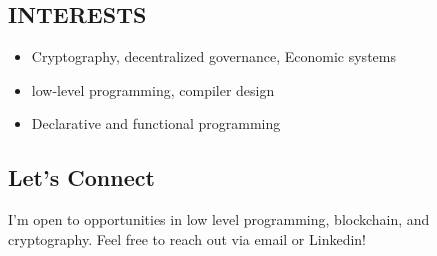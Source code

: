 \documentclass[10pt,letterpaper]{article}
\begin{document}
\begin{minipage}[t]{0.47\textwidth}
\subsection*{INTERESTS}
\label{sec:org844b368}
\begin{itemize}
\item Cryptography, decentralized governance, Economic systems
\item low-level programming, compiler design
\item Declarative and functional programming
\end{itemize}

\vfill
\subsection*{Let's Connect}
\label{sec:org863f885}
I'm open to opportunities in low level programming, blockchain, and cryptography. Feel free to reach out via email or Linkedin!
\end{minipage}
\end{document}
